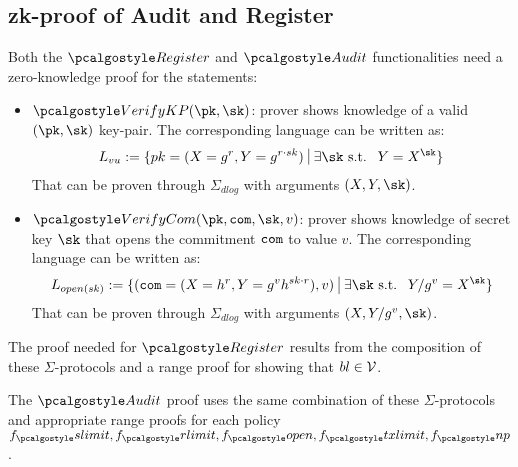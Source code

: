 

\subsection{zk-proof of Audit and Register}
Both the $\reg$ and $\audit$ functionalities need a zero-knowledge proof for the statements: 
\begin{itemize}
    \item $\verkp(\pk,\sk)$: prover shows knowledge of a valid $(\pk, \sk)$ key-pair. 
    The corresponding language can be written as:
    {\begin{align*}
        L_{vu} := \{ pk = (X = g^r, Y = g^{r \cdot sk}) \ \vline \ \exists \sk \text{ s.t. } \ Y = X^\sk \}
    \end{align*}}
    That can be proven through $\Sigma_{dlog}$ with arguments $(X, Y, \sk)$.
    \item $\vercom(\pk, \com, \sk, v)$: prover shows knowledge of secret key $\sk$ that opens the commitment $\texttt{com}$ to value $v$. The corresponding language can be written as:
    {
     \begin{align*}
        L_{open(sk)} := \{ (\com = (X = h^r, Y = g^v h^{sk \cdot r}), v) \ \vline \ \exists \sk \text{ s.t. } \ Y/g^v = X^\sk  \}
     \end{align*}   
    }
    That can be proven through $\Sigma_{dlog}$ with arguments $(X, Y/g^v, \sk)$.

\end{itemize}

The proof needed for $\reg$ results from the composition of these $\Sigma$-protocols and a range proof for showing that $bl \in \mathcal{V}$. 

The $\audit$ proof uses the same combination of these $\Sigma$-protocols and appropriate range proofs for 
each policy $f_\sendlimit , f_\receivelimit , f_\open , f_\txnlimit , f_\nonpart$. 
